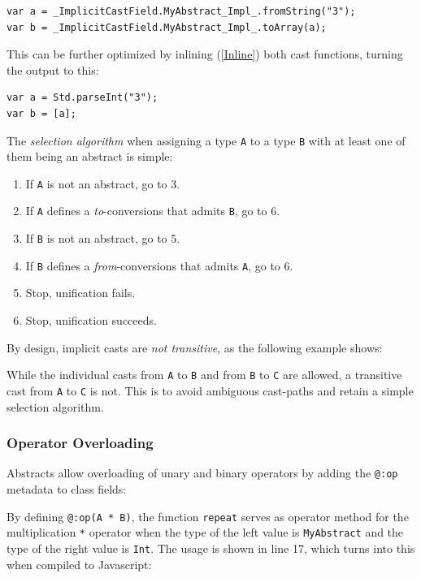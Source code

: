 \documentclass{article}
\newcommand{\target}[1]{#1}
\newcommand{\type}[1]{\texttt{#1}}
\newcommand{\expr}[1]{\texttt{#1}}
\newcommand{\tref}[2]{#1 (\ref{#2})}
\newcommand{\haxe}[2][]{%
}
\begin{document}
\begin{lstlisting}
var a = _ImplicitCastField.MyAbstract_Impl_.fromString("3");
var b = _ImplicitCastField.MyAbstract_Impl_.toArray(a);
\end{lstlisting}
This can be further optimized by \tref{inlining}{Inline} both cast functions, turning the output to this:

\begin{lstlisting}
var a = Std.parseInt("3");
var b = [a];
\end{lstlisting}
The \emph{selection algorithm} when assigning a type \expr{A} to a type \expr{B} with at least one of them being an abstract is simple:

\begin{enumerate}
	\item If \expr{A} is not an abstract, go to 3.
	\item If \expr{A} defines a \emph{to}-conversions that admits \expr{B}, go to 6.
	\item If \expr{B} is not an abstract, go to 5.
	\item If \expr{B} defines a \emph{from}-conversions that admits \expr{A}, go to 6.
	\item Stop, unification fails.
	\item Stop, unification succeeds.
\end{enumerate}
By design, implicit casts are \emph{not transitive}, as the following example shows:

\haxe{assets/ImplicitTransitiveCast.hx}
While the individual casts from \type{A} to \type{B} and from \type{B} to \type{C} are allowed, a transitive cast from \type{A} to \type{C} is not. This is to avoid ambiguous cast-paths and retain a simple selection algorithm. 




\subsubsection{Operator Overloading}

Abstracts allow overloading of unary and binary operators by adding the \expr{@:op} metadata to class fields:

\haxe{assets/AbstractOperatorOverload.hx}
By defining \expr{@:op(A * B)}, the function \expr{repeat} serves as operator method for the multiplication \expr{*} operator when the type of the left value is \type{MyAbstract} and the type of the right value is \type{Int}. The usage is shown in line 17, which turns into this when compiled to \target{Javascript}:
\end{document}
